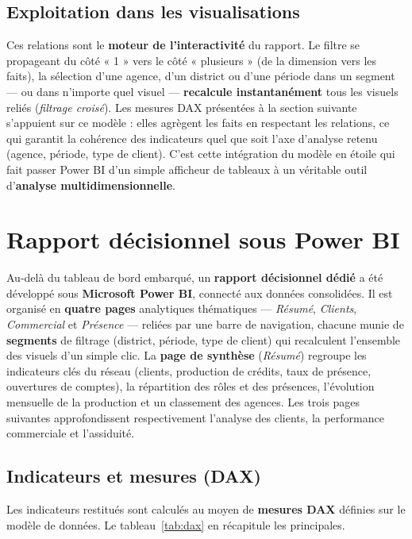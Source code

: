 \FloatBarrier
\subsection{Exploitation dans les visualisations}
Ces relations sont le \textbf{moteur de l'interactivité} du rapport. Le filtre se
propageant du côté « 1 » vers le côté « plusieurs » (de la dimension vers les
faits), la sélection d'une agence, d'un district ou d'une période dans un segment
--- ou dans n'importe quel visuel --- \textbf{recalcule instantanément} tous les
visuels reliés (\emph{filtrage croisé}). Les mesures DAX présentées à la section
suivante s'appuient sur ce modèle : elles agrègent les faits en respectant les
relations, ce qui garantit la cohérence des indicateurs quel que soit l'axe
d'analyse retenu (agence, période, type de client). C'est cette intégration du
modèle en étoile qui fait passer Power BI d'un simple afficheur de tableaux à un
véritable outil d'\textbf{analyse multidimensionnelle}.

\section{Rapport décisionnel sous Power BI}
Au-delà du tableau de bord embarqué, un \textbf{rapport décisionnel dédié} a été
développé sous \textbf{Microsoft Power BI}, connecté aux données consolidées. Il
est organisé en \textbf{quatre pages} analytiques thématiques --- \emph{Résumé},
\emph{Clients}, \emph{Commercial} et \emph{Présence} --- reliées par une barre de
navigation, chacune munie de \textbf{segments} de filtrage (district, période,
type de client) qui recalculent l'ensemble des visuels d'un simple clic. La
\textbf{page de synthèse} (\emph{Résumé}) regroupe les indicateurs clés du réseau
(clients, production de crédits, taux de présence, ouvertures de comptes), la
répartition des rôles et des présences, l'évolution mensuelle de la production et
un classement des agences. Les trois pages suivantes approfondissent
respectivement l'analyse des clients, la performance commerciale et l'assiduité.

\subsection{Indicateurs et mesures (DAX)}
Les indicateurs restitués sont calculés au moyen de \textbf{mesures DAX} définies
sur le modèle de données. Le tableau~\ref{tab:dax} en récapitule les principales.

